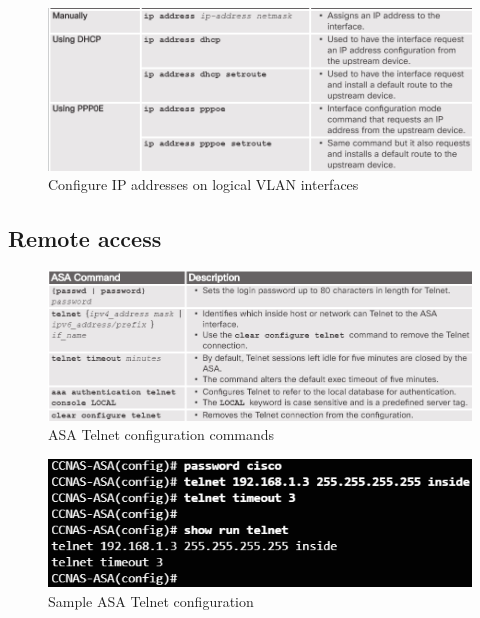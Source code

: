 \begin{figure}[hbtp]
\caption{Configure IP addresses on logical VLAN interfaces}\label{SVIaddr}
\centering
\includegraphics[scale=0.5]{pictures/SVIaddr.PNG}
\end{figure}

\subsection{Remote access}

\begin{figure}[hbtp]
\caption{ASA Telnet configuration commands}\label{TelnetConfigASA}
\centering
\includegraphics[scale=0.5]{pictures/TelnetConfigASA.PNG}
\end{figure}

\begin{figure}[hbtp]
\caption{Sample ASA Telnet configuration}\label{TelnetExample}
\centering
\includegraphics[scale=0.5]{pictures/TelnetExample.PNG}
\end{figure}


